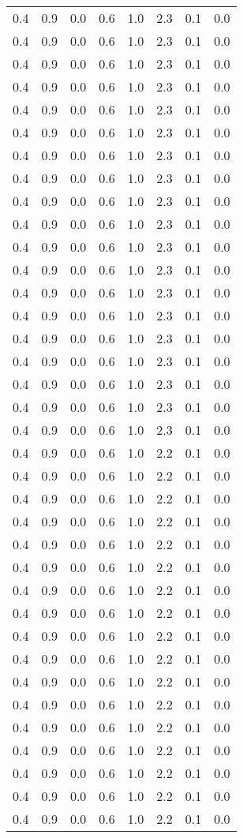 \begin{tabular}{L{1in}|L{1in}|L{1in}|L{1in}|L{1in}|L{1in}|L{1in}|L{1in}}
0.4&0.9&0.0&0.6&1.0&2.3&0.1&0.0\\
0.4&0.9&0.0&0.6&1.0&2.3&0.1&0.0\\
0.4&0.9&0.0&0.6&1.0&2.3&0.1&0.0\\
0.4&0.9&0.0&0.6&1.0&2.3&0.1&0.0\\
0.4&0.9&0.0&0.6&1.0&2.3&0.1&0.0\\
0.4&0.9&0.0&0.6&1.0&2.3&0.1&0.0\\
0.4&0.9&0.0&0.6&1.0&2.3&0.1&0.0\\
0.4&0.9&0.0&0.6&1.0&2.3&0.1&0.0\\
0.4&0.9&0.0&0.6&1.0&2.3&0.1&0.0\\
0.4&0.9&0.0&0.6&1.0&2.3&0.1&0.0\\
0.4&0.9&0.0&0.6&1.0&2.3&0.1&0.0\\
0.4&0.9&0.0&0.6&1.0&2.3&0.1&0.0\\
0.4&0.9&0.0&0.6&1.0&2.3&0.1&0.0\\
0.4&0.9&0.0&0.6&1.0&2.3&0.1&0.0\\
0.4&0.9&0.0&0.6&1.0&2.3&0.1&0.0\\
0.4&0.9&0.0&0.6&1.0&2.3&0.1&0.0\\
0.4&0.9&0.0&0.6&1.0&2.3&0.1&0.0\\
0.4&0.9&0.0&0.6&1.0&2.3&0.1&0.0\\
0.4&0.9&0.0&0.6&1.0&2.3&0.1&0.0\\
0.4&0.9&0.0&0.6&1.0&2.2&0.1&0.0\\
0.4&0.9&0.0&0.6&1.0&2.2&0.1&0.0\\
0.4&0.9&0.0&0.6&1.0&2.2&0.1&0.0\\
0.4&0.9&0.0&0.6&1.0&2.2&0.1&0.0\\
0.4&0.9&0.0&0.6&1.0&2.2&0.1&0.0\\
0.4&0.9&0.0&0.6&1.0&2.2&0.1&0.0\\
0.4&0.9&0.0&0.6&1.0&2.2&0.1&0.0\\
0.4&0.9&0.0&0.6&1.0&2.2&0.1&0.0\\
0.4&0.9&0.0&0.6&1.0&2.2&0.1&0.0\\
0.4&0.9&0.0&0.6&1.0&2.2&0.1&0.0\\
0.4&0.9&0.0&0.6&1.0&2.2&0.1&0.0\\
0.4&0.9&0.0&0.6&1.0&2.2&0.1&0.0\\
0.4&0.9&0.0&0.6&1.0&2.2&0.1&0.0\\
0.4&0.9&0.0&0.6&1.0&2.2&0.1&0.0\\
0.4&0.9&0.0&0.6&1.0&2.2&0.1&0.0\\
0.4&0.9&0.0&0.6&1.0&2.2&0.1&0.0\\
0.4&0.9&0.0&0.6&1.0&2.2&0.1&0.0\\

\end{tabular}
